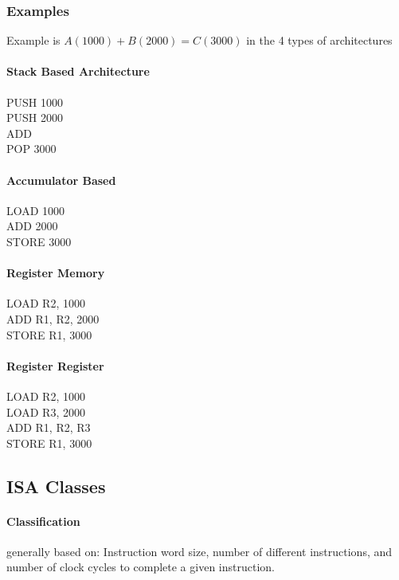 \documentclass{article}
\newcommand\tab[1][0.5cm]{\hspace*{#1}}
\begin{document}
		\subsubsection*{Examples}
			Example is $A(1000) + B(2000) = C(3000)$ in the 4 types of architectures
			
			\paragraph{\tab Stack Based Architecture\\}
					PUSH 1000 \\ \tab
					PUSH 2000 \\ \tab
					ADD \\ \tab
					POP 3000

			\paragraph{\tab Accumulator Based\\}
					LOAD 1000 \\ \tab
					ADD 2000 \\ \tab
					STORE 3000

			\paragraph{\tab Register Memory\\}
					LOAD R2, 1000 \\ \tab
					ADD R1, R2, 2000 \\ \tab
					STORE R1, 3000

			\paragraph{\tab Register Register\\}
					LOAD R2, 1000 \\ \tab
					LOAD R3, 2000 \\ \tab
					ADD R1, R2, R3 \\ \tab
					STORE R1, 3000


	\subsection*{ISA Classes}
		\paragraph{Classification} generally based on: Instruction word size, number of different instructions, and number of clock cycles to complete a given instruction.
\end{document}
